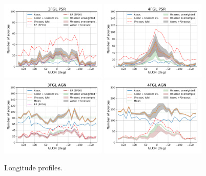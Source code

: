 \begin{figure}[h]
\center
\includegraphics[width=0.45\textwidth]{plots/lon_profile_PSR_3FGL_oversample.pdf}
\includegraphics[width=0.45\textwidth]{plots/lon_profile_PSR_4FGL_oversample.pdf} \\
\includegraphics[width=0.45\textwidth]{plots/lon_profile_AGN_3FGL_oversample.pdf}
\includegraphics[width=0.45\textwidth]{plots/lon_profile_AGN_4FGL_oversample.pdf}
\caption{Longitude profiles.}  
\label{fig:lon_profile}
\end{figure}


